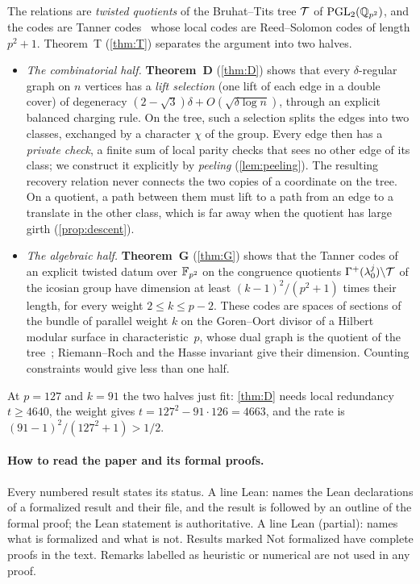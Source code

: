 The relations are \emph{twisted quotients} of the Bruhat--Tits tree $\mathcal{T}$ of $\operatorname{PGL}_2(\mathbb{Q}_{p^2})$, and the codes are
Tanner codes~\cite{Tanner1981} whose local codes are Reed--Solomon codes of length $p^2+1$. Theorem~T (\cref{thm:T})
separates the argument into two halves.
\begin{itemize}
\item \emph{The combinatorial half.} \textbf{Theorem~D} (\cref{thm:D}) shows that every $\delta$-regular graph on $n$
vertices has a \emph{lift selection} (one lift of each edge in a double cover) of degeneracy
$(2-\sqrt3)\delta+O(\sqrt{\delta\log n})$, through an explicit balanced charging rule. On the tree, such a selection splits
the edges into two classes, exchanged by a character $\chi$ of the group. Every edge then has a \emph{private check}, a
finite sum of local parity checks that sees no other edge of its class; we construct it explicitly by \emph{peeling}
(\cref{lem:peeling}). The resulting recovery relation never connects the two copies of a coordinate on the tree. On a
quotient, a path between them must lift to a path from an edge to a translate in the other class, which is far away when
the quotient has large girth (\cref{prop:descent}).
\item \emph{The algebraic half.} \textbf{Theorem~G} (\cref{thm:G}) shows that the Tanner codes of an explicit twisted
datum over $\mathbb{F}_{p^2}$ on the congruence quotients $\Gamma^+(\lambda_0^j)\backslash\mathcal{T}$ of the icosian group have dimension at
least $(k-1)^2/(p^2+1)$ times their length, for every weight $2\le k\le p-2$. These codes are spaces of sections of the
bundle of parallel weight $k$ on the Goren--Oort divisor of a Hilbert modular surface in characteristic~$p$, whose dual
graph is the quotient of the tree~\cite{BachmatGoren1999,KudlaRapoport1999,TianXiao2016}; Riemann--Roch and the Hasse
invariant give their dimension. Counting constraints would give less than one half.
\end{itemize}
At $p=127$ and $k=91$ the two halves just fit: \cref{thm:D} needs local redundancy $t\ge4640$, the weight gives
$t=127^2-91\cdot126=4663$, and the rate is $(91-1)^2/(127^2+1)>1/2$.

\paragraph{How to read the paper and its formal proofs.} Every numbered result states its status. A line \textsf{Lean:}
names the Lean declarations of a formalized result and their file, and the result is followed by an outline of the formal
proof; the Lean statement is authoritative. A line \textsf{Lean (partial):} names what is formalized and what is not.
Results marked \textsf{Not formalized} have complete proofs in the text. Remarks labelled as heuristic or numerical are not used in
any proof.

